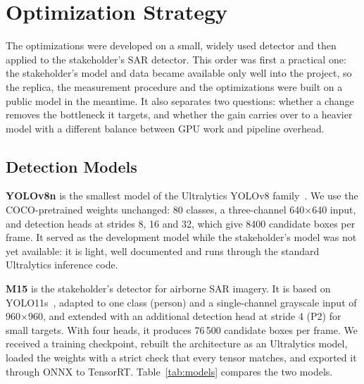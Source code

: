 
\section{Optimization Strategy}
\vspace{0.35em}

The optimizations were developed on a small, widely used detector and then
applied to the stakeholder's SAR detector. This order was first a practical
one: the stakeholder's model and data became available only well into the
project, so the replica, the measurement procedure and the optimizations were
built on a public model in the meantime. It also separates two questions:
whether a change removes the bottleneck it targets, and whether the gain
carries over to a heavier model with a different balance between GPU work and
pipeline overhead.

\subsection{Detection Models}

\textbf{YOLOv8n} is the smallest model of the Ultralytics YOLOv8
family~\cite{ultralytics-yolov8}. We use the COCO-pretrained weights
unchanged: 80 classes, a three-channel 640$\times$640 input, and detection
heads at strides 8, 16 and 32, which give 8400 candidate boxes per frame. It
served as the development model while the stakeholder's model was not yet
available: it is light, well documented and runs through the standard
Ultralytics inference code.

\textbf{M15} is the stakeholder's detector for airborne SAR imagery. It is
based on YOLO11s~\cite{ultralytics-yolo11}, adapted to one class (person) and
a single-channel grayscale input of 960$\times$960, and extended with an
additional detection head at stride 4 (P2) for small targets. With four
heads, it produces 76\,500 candidate boxes per frame. We received a training
checkpoint, rebuilt the architecture as an Ultralytics model, loaded the
weights with a strict check that every tensor matches, and exported it
through ONNX to TensorRT. Table~\ref{tab:models} compares the two models.

